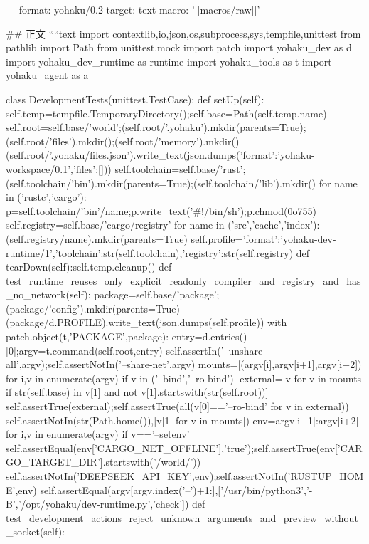 ---
format: yohaku/0.2
target: text
macro: '[[macros/raw]]'
---

## 正文
````text
import contextlib,io,json,os,subprocess,sys,tempfile,unittest
from pathlib import Path
from unittest.mock import patch
import yohaku_dev as d
import yohaku_dev_runtime as runtime
import yohaku_tools as t
import yohaku_agent as a

class DevelopmentTests(unittest.TestCase):
    def setUp(self):
        self.temp=tempfile.TemporaryDirectory();self.base=Path(self.temp.name)
        self.root=self.base/'world';(self.root/'.yohaku').mkdir(parents=True);(self.root/'files').mkdir();(self.root/'memory').mkdir()
        (self.root/'.yohaku/files.json').write_text(json.dumps({'format':'yohaku-workspace/0.1','files':[]}))
        self.toolchain=self.base/'rust';(self.toolchain/'bin').mkdir(parents=True);(self.toolchain/'lib').mkdir()
        for name in ('rustc','cargo'):
            p=self.toolchain/'bin'/name;p.write_text('#!/bin/sh\n');p.chmod(0o755)
        self.registry=self.base/'cargo/registry'
        for name in ('src','cache','index'):(self.registry/name).mkdir(parents=True)
        self.profile={'format':'yohaku-dev-runtime/1','toolchain':str(self.toolchain),'registry':str(self.registry)}
    def tearDown(self):self.temp.cleanup()
    def test_runtime_reuses_only_explicit_readonly_compiler_and_registry_and_has_no_network(self):
        package=self.base/'package';(package/'config').mkdir(parents=True)
        (package/d.PROFILE).write_text(json.dumps(self.profile))
        with patch.object(t,'PACKAGE',package):
            entry=d.entries()[0];argv=t.command(self.root,entry)
        self.assertIn('--unshare-all',argv);self.assertNotIn('--share-net',argv)
        mounts=[(argv[i],argv[i+1],argv[i+2]) for i,v in enumerate(argv) if v in ('--bind','--ro-bind')]
        external=[v for v in mounts if str(self.base) in v[1] and not v[1].startswith(str(self.root))]
        self.assertTrue(external);self.assertTrue(all(v[0]=='--ro-bind' for v in external))
        self.assertNotIn(str(Path.home()),[v[1] for v in mounts])
        env={argv[i+1]:argv[i+2] for i,v in enumerate(argv) if v=='--setenv'}
        self.assertEqual(env['CARGO_NET_OFFLINE'],'true');self.assertTrue(env['CARGO_TARGET_DIR'].startswith('/world/'))
        self.assertNotIn('DEEPSEEK_API_KEY',env);self.assertNotIn('RUSTUP_HOME',env)
        self.assertEqual(argv[argv.index('--')+1:],['/usr/bin/python3','-B','/opt/yohaku/dev-runtime.py','check'])
    def test_development_actions_reject_unknown_arguments_and_preview_without_socket(self):
